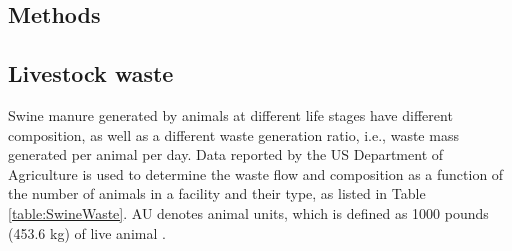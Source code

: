 \begin{refsection}[referencesCh6]
\section{Methods}
\subsection{Livestock waste}
Swine manure generated by animals at different life stages have different composition, as well as a different waste generation ratio, i.e., waste mass generated per animal per day. Data reported by the US Department of Agriculture \citep{USDAWaste, Kellog2000} is used to determine the waste flow and composition as a function of the number of animals in a facility and their type, as listed in Table \ref{table:SwineWaste}. AU denotes animal units, which is defined as 1000 pounds (453.6 kg) of live animal \citep{animal_unit_definition}.


\end{refsection}

